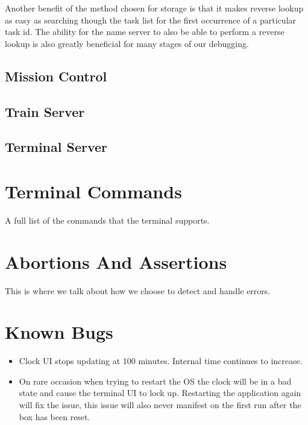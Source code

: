 \documentclass[pdftex,10pt,a4paper]{article}
\begin{document}
Another benefit of the method chosen for storage is that it makes reverse
lookup as easy as searching though the task list for the first occurrence
of a particular task id. The ability for the name server to also be able to
perform a reverse lookup is also greatly beneficial for many stages of our
debugging.

\subsection*{Mission Control}

\subsection*{Train Server}

\subsection*{Terminal Server}


\section*{Terminal Commands}

A full list of the commands that the terminal supports.

\section*{Abortions And Assertions}

This is where we talk about how we choose to detect and handle errors.


\section*{Known Bugs}

\begin{itemize}
\item Clock UI stops updating at 100 minutes. Internal time continues to
	increase.
\item On rare occasion when trying to restart the OS the clock will be in a
	bad state and cause the terminal UI to lock up. Restarting the
	application again will fix the issue, this issue will also never
	manifest on the first run after the box has been reset.
\end{itemize}
\end{document}
